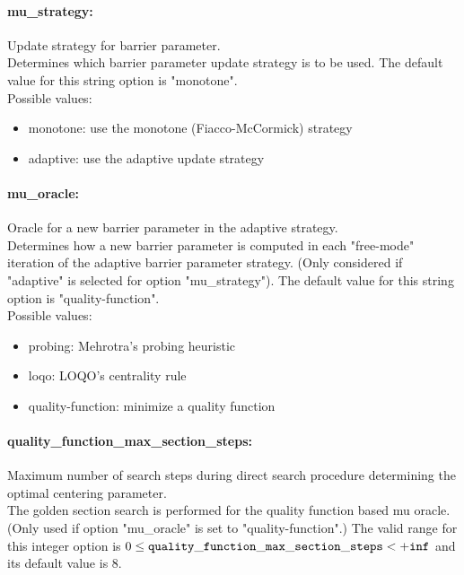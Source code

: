 \paragraph{mu\_strategy:}\label{sec:mu_strategy} Update strategy for barrier parameter. $\;$ \\
 Determines which barrier parameter update
strategy is to be used.
The default value for this string option is "monotone".
\\ 
Possible values:
\begin{itemize}
   \item monotone: use the monotone (Fiacco-McCormick) strategy
   \item adaptive: use the adaptive update strategy
\end{itemize}

\paragraph{mu\_oracle:}\label{sec:mu_oracle} Oracle for a new barrier parameter in the adaptive strategy. $\;$ \\
 Determines how a new barrier parameter is
computed in each "free-mode" iteration of the
adaptive barrier parameter strategy. (Only
considered if "adaptive" is selected for option
"mu\_strategy").
The default value for this string option is "quality-function".
\\ 
Possible values:
\begin{itemize}
   \item probing: Mehrotra's probing heuristic
   \item loqo: LOQO's centrality rule
   \item quality-function: minimize a quality function
\end{itemize}

\paragraph{quality\_function\_max\_section\_steps:}\label{sec:quality_function_max_section_steps} Maximum number of search steps during direct search procedure determining the optimal centering parameter. $\;$ \\
 The golden section search is performed for the
quality function based mu oracle. (Only used if
option "mu\_oracle" is set to "quality-function".) The valid range for this integer option is
$0 \le {\tt quality\_function\_max\_section\_steps } <  {\tt +inf}$
and its default value is $8$.


